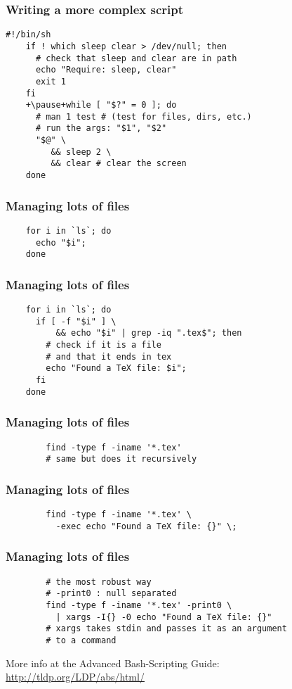 \documentclass[%
        hyperref={%
                pdfauthor={Zakariyya Mughal},%
                pdfpagemode={None},pdfpagelayout={SinglePage}}%
        xcolor={x11names},%
]{beamer}
\begin{document}
\begin{frame}[fragile]
	\frametitle{Writing a more complex script}
	\begin{lstlisting}[escapeinside=++]
	#!/bin/sh
	if ! which sleep clear > /dev/null; then
	  # check that sleep and clear are in path
	  echo "Require: sleep, clear"
	  exit 1
	fi
	+\pause+while [ "$?" = 0 ]; do
	  # man 1 test # (test for files, dirs, etc.)
	  # run the args: "$1", "$2"
	  "$@" \
	     && sleep 2 \
	     && clear # clear the screen
	done
	\end{lstlisting}
\end{frame}
\begin{frame}[fragile]
	\frametitle{Managing lots of files}
	\begin{lstlisting}
	for i in `ls`; do
	  echo "$i";
	done
	\end{lstlisting}
\end{frame}
\begin{frame}[fragile]
	\frametitle{Managing lots of files}
	\begin{lstlisting}
	for i in `ls`; do
	  if [ -f "$i" ] \
	      && echo "$i" | grep -iq ".tex$"; then
	    # check if it is a file
	    # and that it ends in tex
	    echo "Found a TeX file: $i";
	  fi
	done
	\end{lstlisting}
\end{frame}
\begin{frame}[fragile]
	\frametitle{Managing lots of files}
	\begin{lstlisting}
		find -type f -iname '*.tex'
		# same but does it recursively
	\end{lstlisting}
\end{frame}
\begin{frame}[fragile]
	\frametitle{Managing lots of files}
	\begin{lstlisting}
		find -type f -iname '*.tex' \
		  -exec echo "Found a TeX file: {}" \;
	\end{lstlisting}
\end{frame}
\begin{frame}[fragile]
	\frametitle{Managing lots of files}
	\begin{lstlisting}
		# the most robust way
		# -print0 : null separated
		find -type f -iname '*.tex' -print0 \
		  | xargs -I{} -0 echo "Found a TeX file: {}"
		# xargs takes stdin and passes it as an argument
		# to a command
	\end{lstlisting}
\end{frame}

			
\begin{frame}
	More info at the Advanced Bash-Scripting Guide: \url{http://tldp.org/LDP/abs/html/}
\end{frame}
\end{document}
